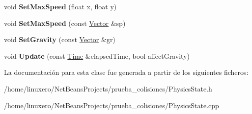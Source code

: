 \begin{DoxyCompactItemize}
\item 
\hypertarget{classPhysicsState_a1947086de9fd881842b91afd50751157}{void {\bfseries Set\-Max\-Speed} (float x, float y)}\label{classPhysicsState_a1947086de9fd881842b91afd50751157}

\item 
\hypertarget{classPhysicsState_a3cd98d73278dd512307f1cee993f8bb0}{void {\bfseries Set\-Max\-Speed} (const \hyperlink{classVector}{Vector} \&sp)}\label{classPhysicsState_a3cd98d73278dd512307f1cee993f8bb0}

\item 
\hypertarget{classPhysicsState_ab51531897f7d8b12d38a83dd25aeadae}{void {\bfseries Set\-Gravity} (const \hyperlink{classVector}{Vector} \&gr)}\label{classPhysicsState_ab51531897f7d8b12d38a83dd25aeadae}

\item 
\hypertarget{classPhysicsState_af21be09abcd1b8c82d3fae999f8abeb8}{void {\bfseries Update} (const \hyperlink{classTime}{Time} \&elapsed\-Time, bool affect\-Gravity)}\label{classPhysicsState_af21be09abcd1b8c82d3fae999f8abeb8}

\end{DoxyCompactItemize}


La documentación para esta clase fue generada a partir de los siguientes ficheros\-:\begin{DoxyCompactItemize}
\item 
/home/linuxero/\-Net\-Beans\-Projects/prueba\-\_\-colisiones/Physics\-State.\-h\item 
/home/linuxero/\-Net\-Beans\-Projects/prueba\-\_\-colisiones/Physics\-State.\-cpp\end{DoxyCompactItemize}
